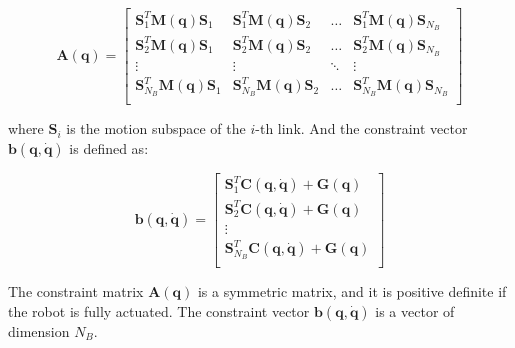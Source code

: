 \begin{equation}
    \mathbf{A} (\mathbf{q}) = \begin{bmatrix}
        \mathbf{S} _1 ^T \mathbf{M} (\mathbf{q}) \mathbf{S} _1     & \mathbf{S} _1 ^T \mathbf{M} (\mathbf{q}) \mathbf{S} _2     & \dots  & \mathbf{S} _1 ^T \mathbf{M} (\mathbf{q}) \mathbf{S} _{N_B}     \\
        \mathbf{S} _2 ^T \mathbf{M} (\mathbf{q}) \mathbf{S} _1     & \mathbf{S} _2 ^T \mathbf{M} (\mathbf{q}) \mathbf{S} _2     & \dots  & \mathbf{S} _2 ^T \mathbf{M} (\mathbf{q}) \mathbf{S} _{N_B}     \\
        \vdots                                                     & \vdots                                                     & \ddots & \vdots                                                         \\
        \mathbf{S} _{N_B} ^T \mathbf{M} (\mathbf{q}) \mathbf{S} _1 & \mathbf{S} _{N_B} ^T \mathbf{M} (\mathbf{q}) \mathbf{S} _2 & \dots  & \mathbf{S} _{N_B} ^T \mathbf{M} (\mathbf{q}) \mathbf{S} _{N_B} \\
    \end{bmatrix}
\end{equation}

where $\mathbf{S} _i$ is the motion subspace of the $i$-th link. And the constraint vector $\mathbf{b} (\mathbf{q}, \dot{\mathbf{q}})$ is defined as:

\begin{equation}
    \mathbf{b} (\mathbf{q}, \dot{\mathbf{q}}) = \begin{bmatrix}
        \mathbf{S} _1 ^T \mathbf{C} (\mathbf{q}, \dot{\mathbf{q}}) + \mathbf{G} (\mathbf{q})     \\
        \mathbf{S} _2 ^T \mathbf{C} (\mathbf{q}, \dot{\mathbf{q}}) + \mathbf{G} (\mathbf{q})     \\
        \vdots                                                                                   \\
        \mathbf{S} _{N_B} ^T \mathbf{C} (\mathbf{q}, \dot{\mathbf{q}}) + \mathbf{G} (\mathbf{q}) \\
    \end{bmatrix}
\end{equation}

The constraint matrix $\mathbf{A} (\mathbf{q})$ is a symmetric matrix, and it is positive definite if the robot is fully actuated. The constraint vector $\mathbf{b} (\mathbf{q}, \dot{\mathbf{q}})$ is a vector of dimension $N_B$.


